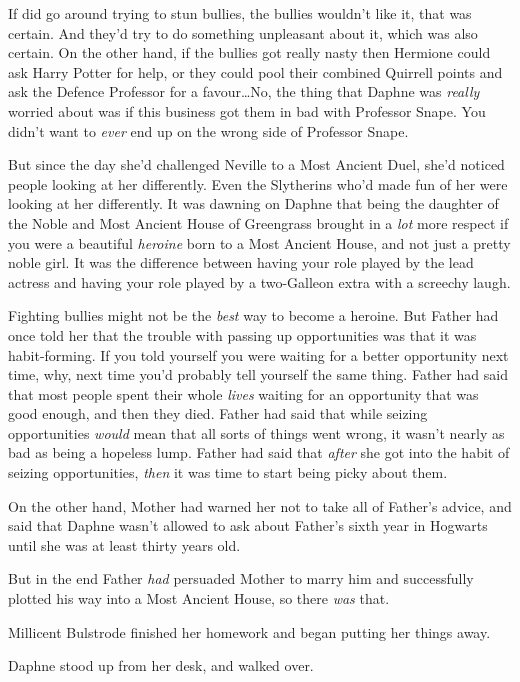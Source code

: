 If \SPHEW did go around trying to stun bullies, the bullies wouldn’t like
it, that was certain. And they’d try to do something unpleasant about it, which
was also certain. On the other hand, if the bullies got really nasty then
Hermione could ask Harry Potter for help, or they could pool their combined
Quirrell points and ask the Defence Professor for a favour…No, the thing
that Daphne was \emph{really} worried about was if this business got them in
bad with Professor Snape. You didn’t want to \emph{ever} end up on the wrong
side of Professor Snape.

But since the day she’d challenged Neville to a Most Ancient Duel, she’d
noticed people looking at her differently. Even the Slytherins who’d made fun
of her were looking at her differently. It was dawning on Daphne that being the
daughter of the Noble and Most Ancient House of Greengrass brought in a
\emph{lot} more respect if you were a beautiful \emph{heroine} born to a Most
Ancient House, and not just a pretty noble girl. It was the difference between
having your role played by the lead actress and having your role played by a
two-Galleon extra with a screechy laugh.

Fighting bullies might not be the \emph{best} way to become a heroine. But
Father had once told her that the trouble with passing up opportunities was
that it was habit-forming. If you told yourself you were waiting for a better
opportunity next time, why, next time you’d probably tell yourself the same
thing. Father had said that most people spent their whole \emph{lives} waiting
for an opportunity that was good enough, and then they died. Father had said
that while seizing opportunities \emph{would} mean that all sorts of things
went wrong, it wasn’t nearly as bad as being a hopeless lump. Father had said
that \emph{after} she got into the habit of seizing opportunities, \emph{then}
it was time to start being picky about them.

On the other hand, Mother had warned her not to take all of Father’s advice,
and said that Daphne wasn’t allowed to ask about Father’s sixth year in
Hogwarts until she was at least thirty years old.

But in the end Father \emph{had} persuaded Mother to marry him and successfully
plotted his way into a Most Ancient House, so there \emph{was} that.

Millicent Bulstrode finished her homework and began putting her things away.

Daphne stood up from her desk, and walked over.

